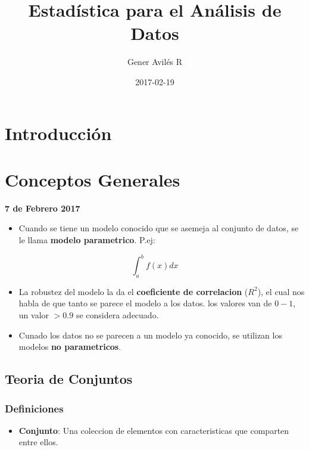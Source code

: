 \documentclass[]{book}
\title{Estadística para el Análisis de Datos}
\author{Gener Avilés R}
\date{2017-02-19}
\providecommand{\tightlist}{%
  \setlength{\itemsep}{0pt}\setlength{\parskip}{0pt}}
\begin{document}
\maketitle

{
\setcounter{tocdepth}{1}
\tableofcontents
}
\chapter{Introducción}\label{introduccion}

\chapter{Conceptos Generales}\label{conceptos-generales}

\textbf{7 de Febrero 2017}

\begin{itemize}
\tightlist
\item
  Cuando se tiene un modelo conocido que se asemeja al conjunto de
  datos, se le llama \textbf{modelo parametrico}. P.ej:
\end{itemize}

\[\int_{a}^{b} f(x)dx\]

\begin{itemize}
\tightlist
\item
  La robustez del modelo la da el \textbf{coeficiente de correlacion}
  (\(R^2\)), el cual nos habla de que tanto se parece el modelo a los
  datos. los valores van de \(0-1\), un valor \(>0.9\) se considera
  adecuado.
\item
  Cunado los datos no se parecen a un modelo ya conocido, se utilizan
  los modelos \textbf{no parametricos}.
\end{itemize}

\section{Teoria de Conjuntos}\label{teoria-de-conjuntos}

\subsection{Definiciones}\label{definiciones}

\begin{itemize}
\tightlist
\item
  \textbf{Conjunto}: Una coleccion de elementos con caracteristicas que
  comparten entre ellos.
\end{itemize}
\end{document}
